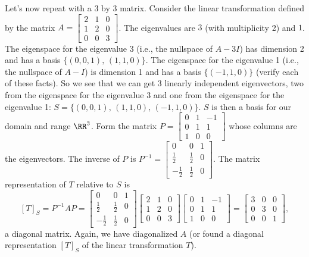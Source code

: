 \begin{example} \label{multiplicityex1}
Let's now repeat with a 3 by 3 matrix. 
Consider the linear transformation defined by the matrix
$A=  
\begin{bmatrix}
 2 & 1 & 0 \\
 1 & 2 & 0 \\
 0 & 0 & 3
\end{bmatrix} 
$. The eigenvalues are $3$ (with multiplicity 2) and $1$.  The eigenspace for the eigenvalue 3 (i.e., the nullspace of $A-3I$) has dimension 2 and has a basis $\{(0,0,1),\, (1,1,0)\}$.  The eigenspace for the eigenvalue 1 (i.e., the nullspace of $A-I$) is dimension 1 and has a basis $\{(-1,1,0)\}$ (verify each of these facts).  So we see that we can get 3 linearly independent eigenvectors, two from the eigenspace for the eigenvalue 3 and one from the eigenspace for the eigenvalue 1: $S=\{(0,0,1),\, (1,1,0),\,(-1,1,0)\}$.  $S$ is then a basis for our domain and range $\RR^3$.  Form the matrix 
$P=
\begin{bmatrix}
 0 & 1 & -1 \\
 0 & 1 & 1 \\
 1 & 0 & 0
\end{bmatrix} 
$ whose columns are the eigenvectors. The inverse of $P$ is 
$P^{-1} = 
\begin{bmatrix}
 0 & 0 & 1 \\
 \frac{1}{2} & \frac{1}{2} & 0 \\
 -\frac{1}{2} & \frac{1}{2} & 0
\end{bmatrix} 
$. The matrix representation of $T$ relative to $S$ is 
$$
[T]_S=P^{-1}AP=
\begin{bmatrix}
 0 & 0 & 1 \\
 \frac{1}{2} & \frac{1}{2} & 0 \\
 -\frac{1}{2} & \frac{1}{2} & 0
\end{bmatrix} 
 \begin{bmatrix}
 2 & 1 & 0 \\
 1 & 2 & 0 \\
 0 & 0 & 3
\end{bmatrix} 
\begin{bmatrix}
 0 & 1 & -1 \\
 0 & 1 & 1 \\
 1 & 0 & 0
\end{bmatrix} 
=
\begin{bmatrix}
 3 & 0 & 0 \\
 0 & 3 & 0 \\
 0 & 0 & 1
\end{bmatrix} 
,$$ a diagonal matrix.  Again, we have diagonalized $A$ (or found a diagonal representation $[T]_S$ of the linear transformation $T$).
\end{example}

